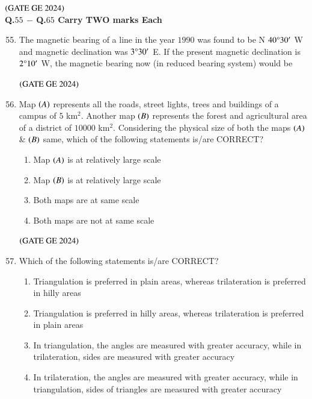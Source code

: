 \documentclass[journal,12pt,onecolumn]{IEEEtran}
\theoremstyle{remark}
\begin{document}
\hfill $\brak{\text{GATE GE 2024}}$
\bigskip
\\
\textbf{Q.$55$ $-$ Q.$65$ Carry TWO marks 
Each}\\
\begin{enumerate}
\setcounter{enumi}{54}
\item The magnetic bearing of a line in the year $1990$ was found to be N $40\degree30'$ W and magnetic declination was $3\degree30'$ E. If the present magnetic declination is $2\degree10'$ W, the magnetic bearing now (in reduced bearing system) would be
\begin{enumerate}
\end{enumerate}
\hfill $\brak{\text{GATE GE 2024}}$
\bigskip
\item Map $\brak{A}$ represents all the roads, street lights, trees and buildings of a campus of $5$ km$^2$.
Another map $\brak{B}$ represents the forest and agricultural area of a district of $10000$ km$^2$.
Considering the physical size of both the maps $\brak{A}$ \& $\brak{B}$ same, which of the following statements is/are CORRECT?
\begin{enumerate}
\item Map $\brak{A}$ is at relatively large scale
\item Map $\brak{B}$ is at relatively large scale
\item Both maps are at same scale
\item Both maps are not at same scale
\end{enumerate}
\hfill $\brak{\text{GATE GE 2024}}$
\bigskip
\item Which of the following statements is/are CORRECT?
\begin{enumerate}
\item Triangulation is preferred in plain areas, whereas trilateration is preferred in hilly areas
\item Triangulation is preferred in hilly areas, whereas trilateration is preferred in plain areas
\item In triangulation, the angles are measured with greater accuracy, while in trilateration, sides are measured with greater accuracy
\item In trilateration, the angles are measured with greater accuracy, while in triangulation, sides of triangles are measured with greater accuracy

\end{enumerate}
\end{enumerate}
\end{document}
